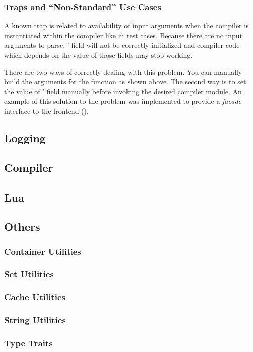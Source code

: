 \subsubsection{Traps and ``Non-Standard'' Use Cases}
A known trap is related to availability of input arguments when the compiler is
instantiated within the compiler like in test cases. Because there are no input
arguments to parse, ' field will not be correctly
initialized and compiler code which depends on the value of those fields may
stop working. 

There are two ways of correctly dealing with this problem. You can manually
build the arguments for the  function as shown above.  The
second way is to set the value of ' field manually
before invoking the desired compiler module. An example of this solution to the
problem was implemented to provide a \emph{facade} interface to the frontend
(). 

\subsection{Logging}
\subsection{Compiler}
\subsection{Lua}
\subsection{Others}
\subsubsection{Container Utilities}
\subsubsection{Set Utilities}
\subsubsection{Cache Utilities}
\subsubsection{String Utilities}
\subsubsection{Type Traits}




